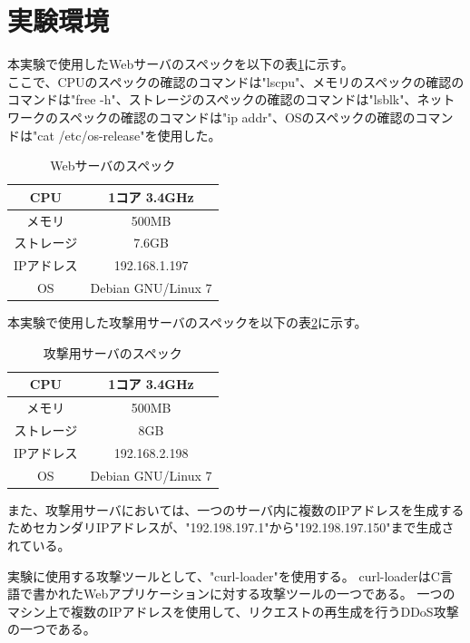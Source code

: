 \documentclass[dvipdfmx]{jsarticle}
\begin{document}
\section{実験環境}

本実験で使用したWebサーバのスペックを以下の表\ref{tab:WebServerSpec}に示す。\\
ここで、CPUのスペックの確認のコマンドは"lscpu"、メモリのスペックの確認のコマンドは"free -h"、ストレージのスペックの確認のコマンドは"lsblk"、ネットワークのスペックの確認のコマンドは"ip addr"、OSのスペックの確認のコマンドは"cat /etc/os-release"を使用した。

\begin{table}[H]
    \centering
    \caption{Webサーバのスペック}
    \label{tab:WebServerSpec}
    \begin{tabular}{|c|c|}
        \hline
        CPU & 1コア 3.4GHz \\
        \hline
        メモリ & 500MB \\
        \hline
        ストレージ & 7.6GB \\
        \hline
        IPアドレス & 192.168.1.197 \\
        \hline
        OS & Debian GNU/Linux 7 \\
        \hline
    \end{tabular}
\end{table}

本実験で使用した攻撃用サーバのスペックを以下の表\ref{tab:AttackerServerSpec}に示す。

\begin{table}[H]
    \centering
    \caption{攻撃用サーバのスペック}
    \label{tab:AttackerServerSpec}
    \begin{tabular}{|c|c|}
        \hline
        CPU & 1コア 3.4GHz \\
        \hline
        メモリ & 500MB \\
        \hline
        ストレージ & 8GB \\
        \hline
        IPアドレス & 192.168.2.198 \\
        \hline
        OS & Debian GNU/Linux 7 \\
        \hline
    \end{tabular}
\end{table}

また、攻撃用サーバにおいては、一つのサーバ内に複数のIPアドレスを生成するためセカンダリIPアドレスが、"192.198.197.1"から"192.198.197.150"まで生成されている。

実験に使用する攻撃ツールとして、"curl-loader"を使用する。
curl-loaderはC言語で書かれたWebアプリケーションに対する攻撃ツールの一つである。
一つのマシン上で複数のIPアドレスを使用して、リクエストの再生成を行うDDoS攻撃の一つである。
\end{document}
